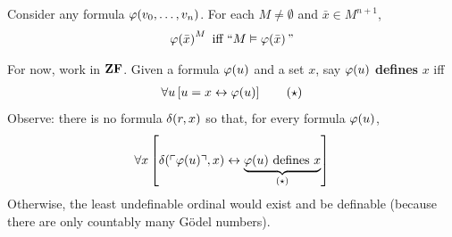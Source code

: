 \begin{boxlemma} \label{Ch3:Lemma:Satisfaction_Relativization}
    Consider any formula $\varphi\!\left( v_0, \ldots, v_n \right)$. For each $M \ne \emptyset$ and $\bar{x} \in M^{n + 1}$,
    \begin{align*}
        \varphi\!\left( \bar{x} \right)^M \text{ iff } ``M \vDash \varphi\!\left( \bar{x} \right)"
    \end{align*}
\end{boxlemma}

For now, work in $\mathbf{ZF}$. Given a formula $\varphi(u)$ and a set $x$, say $\varphi(u)$ \textbf{defines} $x$ iff
\begin{align*}
    \forall u \left[ u = x \leftrightarrow \varphi(u) \right] \tag{$\star$}
\end{align*}
Observe: there is no formula $\delta\!\left( r, x \right)$ so that, for every formula $\varphi(u)$,
\begin{align*}
    \forall x \left[ \delta\!\left( \ulcorner \varphi(u) \urcorner, x \right) \leftrightarrow \underbrace{\varphi(u) \text{ defines } x}_{(\star)} \right]
\end{align*}
Otherwise, the least undefinable ordinal would exist and be definable (because there are only countably many Gödel numbers).
